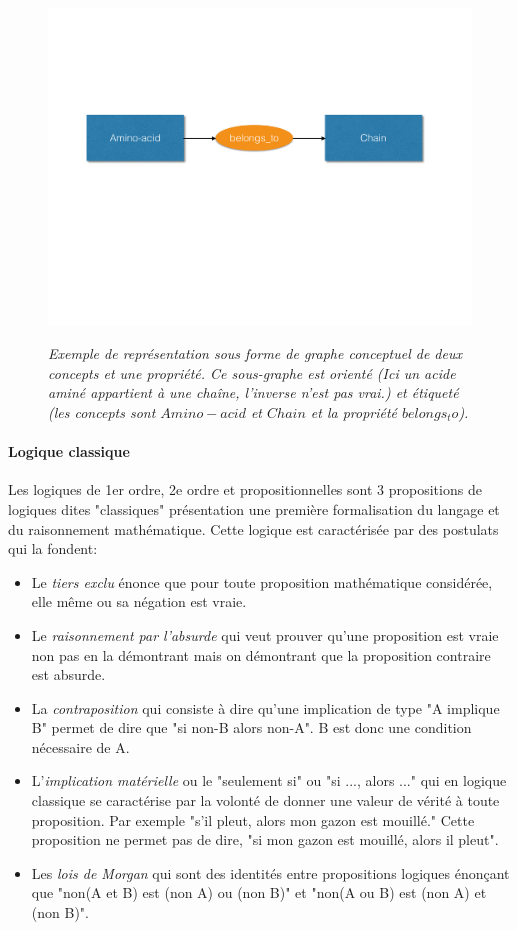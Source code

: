\begin{figure}
  \centering
  {\includegraphics[width=.6\linewidth]{./figures/ch2/conceptual_graph}}
    \caption{\it Exemple de représentation sous forme de graphe conceptuel de deux concepts et une propriété. Ce sous-graphe est orienté (Ici un acide aminé appartient à une chaîne, l'inverse n'est pas vrai.) et étiqueté (les concepts sont $Amino-acid$ et $Chain$ et la propriété $belongs_to$).}
  \label{Fig:conceptual_graph}
  \hspace{0.5cm}
\end{figure}

\paragraph{Logique classique}

Les logiques de 1er ordre, 2e ordre et propositionnelles sont 3 propositions de logiques dites "classiques" présentation une première formalisation du langage et du raisonnement mathématique. Cette logique est caractérisée par des postulats qui la fondent:

\begin{itemize}
	\item Le \textit{tiers exclu} énonce que pour toute proposition mathématique considérée, elle même ou sa négation est vraie.
	\item Le \textit{raisonnement par l'absurde} qui veut prouver qu'une proposition est vraie non pas en la démontrant mais on démontrant que la proposition contraire est absurde.
	\item La \textit{contraposition} qui consiste à dire qu'une implication de type "A implique B" permet de dire que "si non-B alors non-A". B est donc une condition nécessaire de A.
	\item L'\textit{implication matérielle} ou le "seulement si" ou "si ..., alors ..." qui en logique classique se caractérise par la volonté de donner une valeur de vérité à toute proposition. Par exemple "s'il pleut, alors mon gazon est mouillé." Cette proposition ne permet pas de dire, "si mon gazon est mouillé, alors il pleut".
	\item Les \textit{lois de Morgan} qui sont des identités entre propositions logiques énonçant que "non(A et B) est (non A) ou (non B)" et "non(A ou B) est (non A) et (non B)".
\end{itemize}

